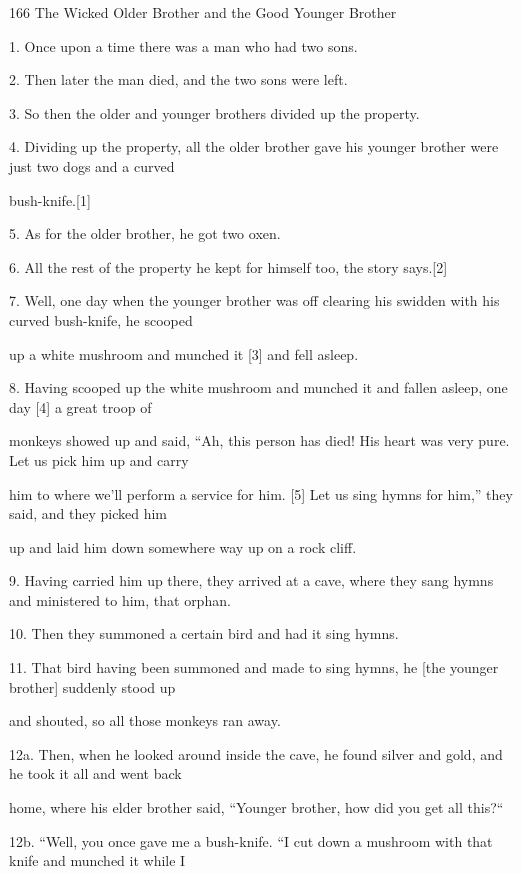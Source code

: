 
{166 The Wicked Older Brother and the Good Younger Brother}

{1. Once upon a time there was a man who had two sons.  }

{2. Then later the man died, and the two sons were left.}

{3. So then the older and younger brothers divided up the property.}

{4. Dividing up the property, all the older brother gave his younger brother
were just two dogs and a curved     }

{bush-knife.[1]}

{5. As for the older brother, he got two oxen.}

{6. All the rest of the property he kept for himself too, the story says.[2]
}

{7. Well, one day when the younger brother was off clearing his swidden
with his curved bush-knife, he scooped     }

{up a white mushroom and munched it [3] and fell asleep.}

{8. Having scooped up the white mushroom and munched it and fallen asleep,
one day [4] a great troop of     }

{monkeys showed up and said, ``Ah, this person has died! His heart was very
pure. Let us pick him up and carry     }

{him  to where we'll perform a service for him. [5]  Let us sing hymns for
him,'' they said, and they picked him     }

{up and laid him down somewhere way up on a rock cliff.}

{9. Having carried him up there, they arrived at a cave, where they sang
hymns and ministered to him, that orphan.}

{10. Then they summoned a certain bird and had it sing hymns.}

{11. That bird having been summoned and made to sing hymns, he [the younger
brother] suddenly stood up      }

{and shouted, so all those monkeys ran away.}

{12a. Then, when he looked around inside the cave, he found silver and gold,
and he took it all and went back        }

{home,  where his elder brother said, ``Younger brother, how did you get
all this?``        }

{12b. ``Well, you once gave me a bush-knife. ``I cut down a mushroom with
that knife and munched it while I         }

